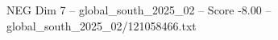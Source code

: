 \begin{textsample}{NEG Dim 7 – global\_south\_2025\_02 – Score -8.00 – global\_south\_2025\_02/121058466.txt}
\end{textsample}
